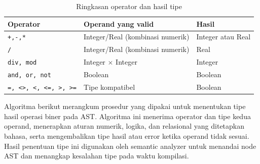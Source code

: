 \begin{table}[H]
    \centering
    \caption{Ringkasan operator dan hasil tipe}
    \label{tab:operator-types}
    \begin{tabularx}{\textwidth}{L L C{2.8cm}}
        \toprule
        \textbf{Operator}            & \textbf{Operand yang valid}      & \textbf{Hasil}    \\
        \midrule
        \texttt{+,-,*}               & Integer/Real (kombinasi numerik) & Integer atau Real \\
        \texttt{/}                   & Integer/Real (kombinasi numerik) & Real              \\
        \texttt{div, mod}            & Integer \(\times\) Integer       & Integer           \\
        \texttt{and, or, not}        & Boolean                          & Boolean           \\
        \texttt{=, <>, <, <=, >, >=} & Tipe kompatibel                  & Boolean           \\
        \bottomrule
    \end{tabularx}
\end{table}

Algoritma berikut merangkum prosedur yang dipakai untuk menentukan tipe hasil
operasi biner pada AST. Algoritma ini menerima operator dan tipe kedua operand,
menerapkan aturan numerik, logika, dan relasional yang ditetapkan bahasa,
serta mengembalikan tipe hasil atau error ketika operand tidak sesuai. Hasil
penentuan tipe ini digunakan oleh semantic analyzer untuk menandai node AST dan
menangkap kesalahan tipe pada waktu kompilasi.

